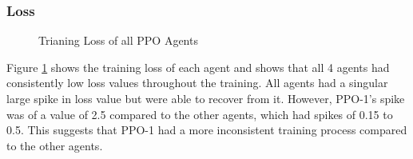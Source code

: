 \subsubsection{Loss}
\begin{figure}[H]
    \centering
    \caption{Trianing Loss of all PPO Agents}
    \label{fig:PPO_training_loss}
\end{figure}

Figure \ref{fig:PPO_training_loss} shows the training loss of each agent and shows that all 4 agents had consistently low loss values throughout the training. All agents had a singular large spike in loss value but were able to recover from it. However, PPO-1's spike was of a value of 2.5 compared to the other agents, which had spikes of 0.15 to 0.5. This suggests that PPO-1 had a more inconsistent training process compared to the other agents. 

